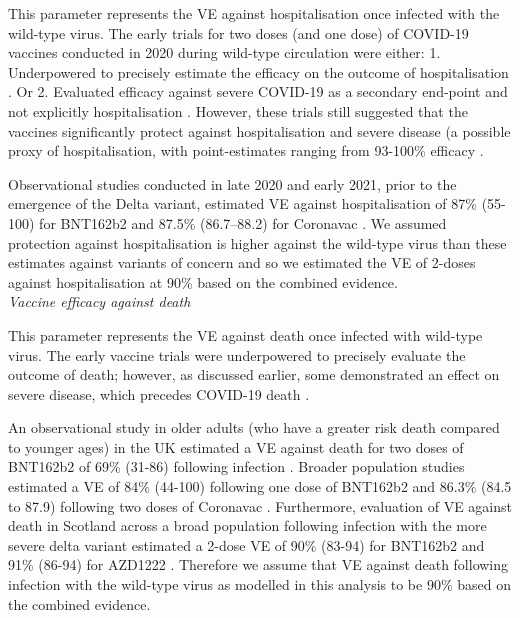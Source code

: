 This parameter represents the VE against hospitalisation once infected with the wild-type virus.
The early trials for two doses (and one dose) of COVID-19 vaccines conducted in 2020 during wild-type circulation were either:
1. Underpowered to precisely estimate the efficacy on the outcome of hospitalisation \cite{falsey2021, tanriover2021}.
Or
2. Evaluated efficacy against severe COVID-19 as a secondary end-point and not explicitly hospitalisation  \cite{elsahly2021, thomas2021, ella2021, alkaabi2021}.
However, these trials still suggested that the vaccines significantly protect against hospitalisation and severe disease (a possible proxy of hospitalisation, with point-estimates ranging from 93-100\% efficacy \cite{falsey2021, tanriover2021, elsahly2021, thomas2021, ella2021, alkaabi2021}.

Observational studies conducted in late 2020 and early 2021, prior to the emergence of the Delta variant, estimated VE against hospitalisation of 87\% (55-100) for BNT162b2 and 87.5\%
(86.7–88.2) for Coronavac \cite{dagan2021, jara2021}. We assumed protection against hospitalisation is higher against the wild-type virus than these estimates against variants of concern 
and so we estimated the VE of 2-doses against hospitalisation at 90\% based on the combined evidence.\\

\textit{Vaccine efficacy against death}

This parameter represents the VE against death once infected with wild-type virus.
The early vaccine trials were underpowered to precisely evaluate the outcome of death; however, as discussed earlier, some 
demonstrated an effect on severe disease, which precedes COVID-19 death \cite{elsahly2021, thomas2021, ella2021, alkaabi2021}.

An observational study in older adults (who have a greater risk death compared to younger ages) in the UK estimated a VE against death 
for two doses of BNT162b2 of 69\% (31-86) following infection \cite{lopez2021}. Broader population studies estimated a VE of 
84\% (44-100) following one dose of BNT162b2 and 86.3\% (84.5 to 87.9) following two doses of Coronavac \cite{dagan2021, jara2021}. 
Furthermore, evaluation of VE against death in Scotland across a broad population following infection with the more severe delta variant estimated a 2-dose VE of 90\% (83-94) for BNT162b2 and 91\% (86-94) for AZD1222 \cite{sheikh2021}. 
Therefore we assume that VE against death following infection with the wild-type virus as modelled in this analysis to be 90\% based on the combined evidence.

